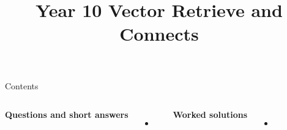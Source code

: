\documentclass{beamer}
\title{Year 10 Vector Retrieve and Connects}
\date{}
\begin{document}
\frame{\titlepage}

\begin{frame}{Contents}
\small
\begin{columns}[T]
\textbf{Questions and short answers}
\begin{itemize}
  \item \hyperlink{q-st1}{}
\end{itemize}

\textbf{Worked solutions}
\begin{itemize}
  \item \hyperlink{work-st1}{}
\end{itemize}
\end{columns}
\end{frame}
\end{document}
